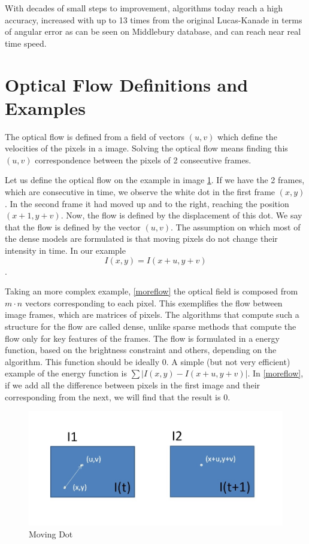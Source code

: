 \documentclass[12pt,a4paper,twoside]{report}
\begin{document}
 With decades of small steps to improvement, algorithms today reach a high accuracy, increased with up to 13 times from the original Lucas-Kanade in terms of angular error as can be seen on Middlebury database, and can reach near real time speed.
 



\section{Optical Flow Definitions and Examples}

The optical flow is defined from a field of vectors $(u,v)$ which define the velocities of the pixels in a image.
Solving the optical flow means finding this $(u,v)$ correspondence between the pixels of 2 consecutive frames.

Let us define the optical flow on the example in image \ref{movingDot}. If we have the 2 frames, which are consecutive in time, we observe the white dot in the first frame $(x,y)$. In the second frame it had moved up and to the right, reaching the position $(x+1, y+v)$. Now, the flow is defined by the displacement of this dot. We say that the flow is defined by the vector $(u,v)$. The assumption on which most of the dense models are formulated is that moving pixels do not change their intensity in time. In our example $$I(x,y) = I(x+u, y+v)$$.

Taking an more complex example, \ref{moreflow} the optical field is composed from $m\cdot n$ vectors corresponding to each pixel. This exemplifies the flow between image frames, which are matrices of pixels. The algorithms that compute such a structure for the flow are called dense, unlike sparse methods that compute the flow only for key features of the frames. The flow is formulated in a energy function, based on the brightness  constraint and others, depending on the algorithm. This function should be ideally $0$. A simple (but not very efficient) example of the energy function is $\sum |I(x,y) - I(x+u, y+v)|$. In \ref{moreflow}, if we add all the difference between pixels in the first image and their corresponding from the next, we will find that the result is 0.
\begin{figure} \label{movingDot}
\centering
\includegraphics[width = 5in]{img/movingDot} 
	\caption{Moving Dot}
\end{figure}
\end{document}
